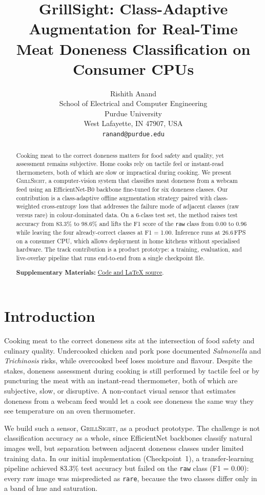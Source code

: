 \documentclass{article}
\title{GrillSight: Class-Adaptive Augmentation for Real-Time \\
Meat Doneness Classification on Consumer CPUs}
\author{Rishith Anand \\
School of Electrical and Computer Engineering \\
Purdue University \\
West Lafayette, IN 47907, USA \\
\texttt{ranand@purdue.edu}
}
\begin{document}
\maketitle

\begin{abstract}
Cooking meat to the correct doneness matters for food safety and
quality, yet assessment remains subjective. Home cooks rely on
tactile feel or instant-read thermometers, both of which are slow or impractical
during cooking. We present \textsc{GrillSight}, a computer-vision
system that classifies meat doneness from a webcam feed using an
EfficientNet-B0 backbone fine-tuned for six doneness classes. Our
contribution is a class-adaptive offline augmentation strategy paired with
class-weighted cross-entropy loss that addresses the failure mode of
adjacent classes (raw versus rare) in colour-dominated data.
On a 6-class test set, the method raises test accuracy from 83.3\% to
98.6\% and lifts the F1 score of the \texttt{raw} class from 0.00 to
0.96 while leaving the four already-correct classes at F1 = 1.00. Inference
runs at 26.6\,FPS on a consumer CPU, which allows deployment in home kitchens
without specialised hardware. The track contribution is a product
prototype: a training, evaluation, and live-overlay pipeline that runs
end-to-end from a single checkpoint file.

\vspace{0.5em}
\noindent\textbf{Supplementary Materials:} \href{https://github.com/ranand3385/Grillsight}{Code and \LaTeX{} source}.
\end{abstract}

\section{Introduction}
\label{sec:intro}

Cooking meat to the correct doneness sits at the intersection of food safety and
culinary quality. Undercooked chicken and pork pose documented \textit{Salmonella}
and \textit{Trichinosis} risks, while overcooked beef loses moisture and flavour.
Despite the stakes, doneness assessment during cooking is still performed
by tactile feel or by puncturing the meat with an instant-read thermometer,
both of which are subjective, slow, or disruptive. A non-contact visual sensor
that estimates doneness from a webcam feed would let a cook see
doneness the same way they see temperature on an oven thermometer.

We build such a sensor, \textsc{GrillSight}, as a product prototype. The
challenge is not classification accuracy as a whole, since EfficientNet backbones
classify natural images well, but separation between
adjacent doneness classes under limited training data. In our initial
implementation (Checkpoint~1), a transfer-learning pipeline
achieved 83.3\% test accuracy but failed on the \texttt{raw} class
(F1 = 0.00): every raw image was mispredicted as \texttt{rare}, because the two
classes differ only in a band of hue and saturation.
\end{document}
